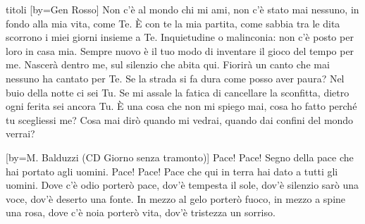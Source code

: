 \begin{songs}{titoli}
[by={Gen Rosso}]
\beginverse
Non c'è al mondo chi mi ami, non c'è stato mai nessuno,
in fondo alla mia vita, come Te.
È con te la mia partita, come sabbia tra le dita
scorrono i miei giorni insieme a Te.
Inquietudine o malinconia:
non c'è posto per loro in casa mia.
Sempre nuovo è il tuo modo di
inventare il gioco del tempo per me.
\endverse
\beginchorus
Nascerà dentro me, sul silenzio che abita qui.
Fiorirà un canto che mai nessuno ha cantato per Te.
\endchorus
\beginverse
Se la strada si fa dura come posso aver paura?
Nel buio della notte ci sei Tu.
Se mi assale la fatica di cancellare la sconfitta,
dietro ogni ferita sei ancora Tu.
È una cosa che non mi spiego mai,
cosa ho fatto perché tu scegliessi me?
Cosa mai dirò quando mi vedrai,
quando dai confini del mondo verrai?
\endverse
\endsong

[by={M. Balduzzi (CD Giorno senza tramonto)}]
\beginchorus
Pace! Pace! Segno della pace che hai portato agli uomini.
Pace! Pace! Pace che qui in terra hai dato a tutti gli uomini.
\endchorus
\beginverse*
Dove c'è odio porterò pace, dov'è tempesta il sole,
dov'è silenzio sarò una voce, dov'è deserto una fonte.
In mezzo al gelo porterò fuoco, in mezzo a spine una rosa,
dove c'è noia porterò vita, dov'è tristezza un sorriso.
\endverse
\endsong

\end{songs}
